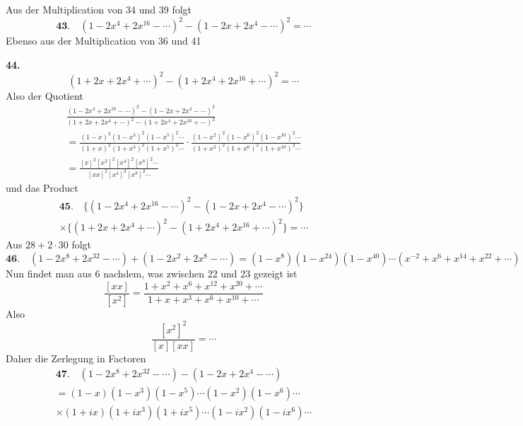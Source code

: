 \documentclass[10pt,a4paper]{article}
\begin{document}
Aus der Multiplication von 34 und 39 folgt
%
\begin{equation*}
\textbf{43.} \quad (1 - 2x^4 + 2x^{16} - \cdots)^2 - (1 - 2x + 2x^4 - \cdots)^2 = \cdots
\end{equation*}
%
Ebenso aus der Multiplication von 36 und 41

\newpage

\textbf{44.}
\begin{equation*}
(1 + 2x + 2x^4 + \cdots)^2 - (1 + 2x^4 + 2x^{16} + \cdots)^2 = \cdots
\end{equation*}
%
Also der Quotient
%
\begin{multline*}
\frac{(1 - 2x^4 + 2x^{16} - \cdots)^2 - (1 - 2x + 2x^4 - \cdots)^2}{(1 + 2x + 2x^4 + \cdots)^2 - (1 + 2x^4 + 2x^{16} + \cdots)^2} \\
= \frac{(1 - x)^2(1 - x^3)^2(1 - x^5)^2 \cdots}{(1 + x)^2(1 + x^3)^2(1 + x^5)^2 \cdots} \cdot
\frac{(1 - x^2)^2(1 - x^6)^2(1 - x^{10})^2 \cdots}{(1 + x^2)^2(1 + x^6)^2(1 + x^{10})^2 \cdots} \\
= \frac{[x]^2 [x^2]^2 [x^4]^2 [x^8]^2 \cdots}{[xx]^2 [x^4]^2 [x^8]^2 \cdots}
\end{multline*}
%
und das Product
%
\begin{multline*}
\textbf{45.} \quad \bigl\{(1 - 2x^4 + 2x^{16} - \cdots)^2 - (1 - 2x + 2x^4 - \cdots)^2\bigr\} \\
\times \bigl\{(1 + 2x + 2x^4 + \cdots)^2 - (1 + 2x^4 + 2x^{16} + \cdots)^2\bigr\} = \cdots
\end{multline*}
%
Aus $28 + 2 \cdot 30$ folgt
%
\begin{equation*}
\textbf{46.} \quad (1 - 2x^8 + 2x^{32} - \cdots) + (1 - 2x^2 + 2x^8 - \cdots) =
(1 - x^8)(1 - x^{24})(1 - x^{40}) \cdots (x^{-2} + x^6 + x^{14} + x^{22} + \cdots)
\end{equation*}
%
Nun findet man aus 6 nachdem, was zwischen 22 und 23 gezeigt ist
%
\begin{equation*}
\frac{[xx]}{[x^2]} = \frac{1 + x^2 + x^6 + x^{12} + x^{20} + \cdots}{1 + x + x^3 + x^6 + x^{10} + \cdots}
\end{equation*}
%
Also
%
\begin{equation*}
\frac{[x^2]^2}{[x][xx]} = \cdots
\end{equation*}
%
Daher die Zerlegung in Factoren
%
\begin{multline*}
\textbf{47.} \quad (1 - 2x^8 + 2x^{32} - \cdots) - (1 - 2x + 2x^4 - \cdots) \\
= (1 - x)(1 - x^3)(1 - x^5) \cdots (1 - x^2)(1 - x^6) \cdots \\
\times (1 + ix)(1 + ix^3)(1 + ix^5) \cdots (1 - ix^2)(1 - ix^6) \cdots
\end{multline*}
\end{document}

